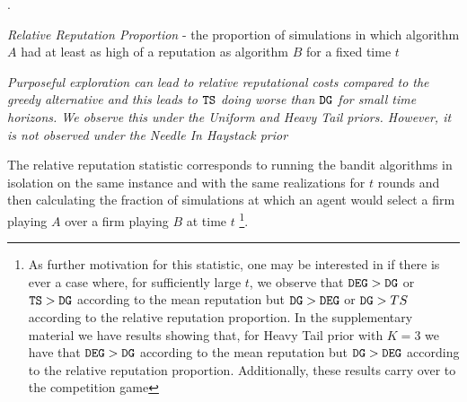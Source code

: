 \documentclass[../competing_bandits.tex]{subfiles}
\begin{document}
{.


\begin{definition}
\textit{Relative Reputation Proportion} - the proportion of simulations in which algorithm $A$ had at least as high of a reputation as algorithm $B$ for a fixed time $t$
\end{definition}


\begin{finding}
\textit{Purposeful exploration can lead to relative reputational costs compared to the greedy alternative and this leads to $\mathtt{TS}$ doing worse than $\mathtt{DG}$ for small time horizons. We observe this under the Uniform and Heavy Tail priors. However, it is not observed under the Needle In Haystack prior}
\end{finding}

The relative reputation statistic corresponds to running the bandit algorithms in isolation on the same instance and with the same realizations for $t$ rounds and then calculating the fraction of simulations at which an agent would select a firm playing $A$ over a firm playing $B$ at time $t$ \footnote{As further motivation for this statistic, one may be interested in if there is ever a case where, for sufficiently large $t$, we observe that $\mathtt{DEG} >\mathtt{DG}$ or $\mathtt{TS} > \mathtt{DG}$ according to the mean reputation but $\mathtt{DG} > \mathtt{DEG}$ or $\mathtt{DG} > TS$ according to the relative reputation proportion. In the supplementary material we have results showing that, for Heavy Tail prior with $K=3$ we have that $\mathtt{DEG} > \mathtt{DG}$ according to the mean reputation but $\mathtt{DG} > \mathtt{DEG}$ according to the relative reputation proportion. Additionally, these results carry over to the competition game}.

}
\end{document}
